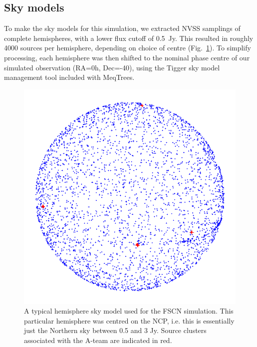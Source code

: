 \documentclass{aa}
\begin{document}
\subsection{Sky models}

To make the sky models for this simulation, we extracted NVSS samplings of complete hemispheres, with a lower flux cutoff of 0.5~Jy. This resulted in roughly 4000 sources per hemisphere, depending on choice of centre (Fig.~\ref{fig:ncp-skymodel}). To simplify processing, each hemisphere was then shifted to the nominal phase centre of our simulated observation (RA=0h, Dec=-40\degr), using the Tigger sky model management tool included with MeqTrees.

\begin{figure}
\centering \includegraphics[width=.7\columnwidth]{ncp-skymodel-transp}
\caption{\label{fig:ncp-skymodel}A typical hemisphere sky model used for the FSCN simulation. This particular hemisphere was centred on the NCP, i.e. this is essentially just the Northern sky between 0.5 and 3 Jy. Source clusters associated with the A-team are indicated in red.}
\end{figure}
\end{document}
